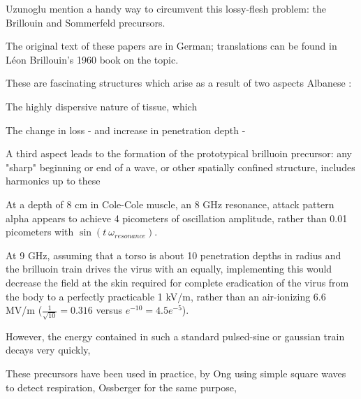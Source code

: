 \documentclass[paper.tex]{subfiles}
\begin{document}
Uzunoglu \cite{Theoretical2020} mention a handy way to circumvent this lossy-flesh problem: the Brillouin and Sommerfeld precursors.



The original text of these papers are in German; translations can be found in Léon Brillouin's 1960 book\cite{Wave1960} on the topic. \footnotemark



These are fascinating structures which arise as a result of two aspects Albanese \cite{Shortrisetime1989}: 

The highly dispersive nature of tissue, which

The change in loss - and increase in penetration depth - 

A third aspect leads to the formation of the prototypical brilluoin precursor: any "sharp" beginning or end of a wave, or other spatially confined structure, includes harmonics up to these \footnotemark



At a depth of 8 cm in Cole-Cole muscle, an 8 GHz resonance, attack pattern alpha appears to achieve 4 picometers of oscillation amplitude, rather than 0.01 picometers with $\sin(t\ \omega_{resonance})$.



At 9 GHz, assuming that a torso is about 10 penetration depths in radius and the brilluoin train drives the virus with an equally, implementing this would decrease the field at the skin required for complete eradication of the virus from the body to a perfectly practicable 1 kV/m, rather than an air-ionizing 6.6 MV/m ($\frac{1}{\sqrt{10}}=0.316$ versus $e^{-10}=4.5e^{-5}$). 

However, the energy contained in such a standard pulsed-sine or gaussian train decays very quickly, 

These precursors have been used in practice, by Ong \cite{Detection2003} using simple square waves to detect respiration\footnotemark, Ossberger \cite{Noninvasive2004} for the same purpose,
\end{document}
